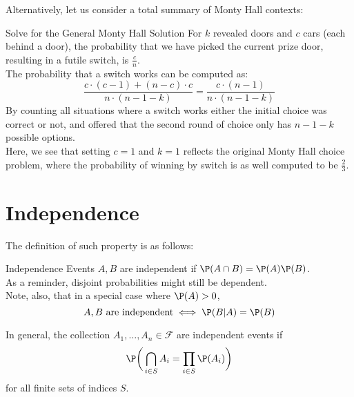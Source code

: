 Alternatively, let us consider a total summary of Monty Hall contexts:
\begin{ln-practice}{Solve for the General Monty Hall Solution}{}
    For $k$ revealed doors and $c$ cars (each behind a door), the probability that we have picked the current prize door, resulting in a futile switch, is $\frac{c}{n}$. \\
    The probability that a switch works can be computed as:
    \[
        \frac{c \cdot (c - 1) + (n - c) \cdot c}{n \cdot (n - 1 - k)} = \frac{c \cdot (n - 1)}{n \cdot (n - 1 - k)}
    \]
    By counting all situations where a switch works either the initial choice was correct or not, and offered that the second round of choice only has $n - 1 - k$ possible options. \\

    Here, we see that setting $c = 1$ and $k = 1$ reflects the original Monty Hall choice problem, where the probability of winning by switch is as well computed to be $\frac{2}{3}$.
\end{ln-practice}

\section{Independence}
The definition of such property is as follows:
\begin{ln-define}{Independence}{}
    Events $A, B$ are independent if $\P(A \cap B) = \P(A) \P(B)$. \\
    As a reminder, disjoint probabilities might still be dependent. \\

    Note, also, that in a special case where $\P(A) > 0$,
    \[A, B \text{ are independent} \iff \P(B | A) = \P(B)\]
\end{ln-define}
In general, the collection $A_1, \dots, A_n \in \mathcal{F}$ are independent events if
\[\P\bigg( \bigcap_{i \in S} A_i = \prod_{i \in S} \P(A_i) \bigg)\]
for all finite sets of indices $S$.

